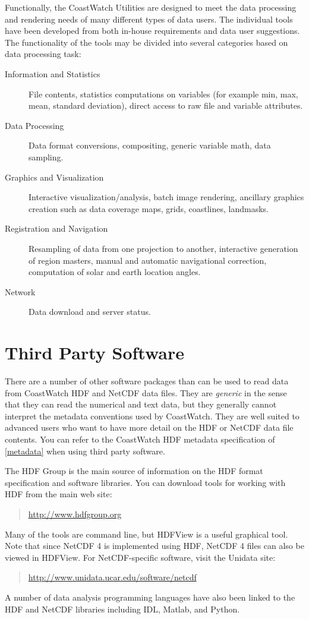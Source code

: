 Functionally, the CoastWatch Utilities are designed to meet the data
processing and rendering needs of many different types of data users.
The individual tools have been developed from both in-house
requirements and data user suggestions.  The functionality of the
tools may be divided into several categories based on data processing
task:
\begin{description}

  \item[Information and Statistics] File contents, statistics
  computations on variables (for example min, max, mean, standard
  deviation), direct access to raw file and variable attributes.

  \item[Data Processing] Data format conversions,
  compositing, generic variable math, data sampling.

  \item[Graphics and Visualization] Interactive
  visualization/analysis, batch image rendering, ancillary graphics
  creation such as data coverage maps, grids, coastlines, landmasks.
    
  \item[Registration and Navigation] Resampling of data from one
  projection to another, interactive generation of region masters,
  manual and automatic navigational correction, computation of solar
  and earth location angles.

  \item[Network] Data download and server status.

\end{description}

\section{Third Party Software}
\label{third}

There are a number of other software packages than can
be used to read data from CoastWatch HDF and NetCDF data files.  They are {\em
generic} in the sense that they can read the numerical and text data,
but they generally cannot interpret the metadata conventions used by CoastWatch.
They are well suited to advanced users who want to have more detail on
the HDF or NetCDF data file contents.  You can refer to the CoastWatch
HDF metadata specification of \autoref{metadata} when using third
party software.

The HDF Group is the main source of information
on the HDF format specification and software libraries.  You can
download tools for working with HDF from the main web site:
\begin{quote}
  \url{http://www.hdfgroup.org}
\end{quote} 
Many of the tools are command line, but HDFView is a useful graphical
tool.  Note that since NetCDF 4 is implemented using HDF, NetCDF 4 files can
also be viewed in HDFView.  For NetCDF-specific software, visit the Unidata site:
\begin{quote}
  \url{http://www.unidata.ucar.edu/software/netcdf}
\end{quote}

A number of data analysis programming languages have also been linked to the
HDF and NetCDF libraries including IDL, Matlab, and Python.

